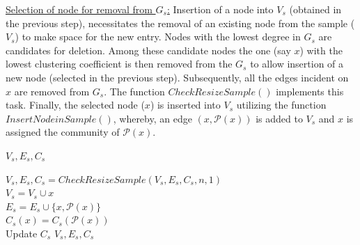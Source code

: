 \noindent\underline{Selection of node for removal from $G_s$:}
Insertion of a node into $V_s$  (obtained in the previous step), 
necessitates the removal of an existing node from the sample ($V_s$) to make space for the new entry. 
Nodes with the lowest degree in $G_s$ are candidates for deletion. Among these candidate nodes the one (say $x$) with  the lowest clustering coefficient is then removed from the $G_s$ to allow insertion of a new node (selected in the previous step). Subsequently, all the edges incident on $x$ are removed from $G_s$. The function $CheckResizeSample()$ implements this task. Finally, the selected node ($x$) is inserted into $V_s$ utilizing the function $InsertNodeinSample()$, whereby, an edge $(x,\mathcal{P}(x))$ is added to $V_s$ and $x$ is assigned the community of $\mathcal{P}(x)$. 

\begin{function4}[!ht]
\caption{\small$CheckResizeSample(V_s,C_s,n,m)$}
\label{resizesample}
\Return $V_s,E_s,C_s$
\end{function4}

\begin{function5}[!ht]
 \caption{\small $InsertNodeinSample(x,\mathcal{P}(x),V_s,E_s,C_s)$}
 \label{insertnodesample}
 $V_s,E_s,C_s=CheckResizeSample(V_s,E_s,C_s,n,1)$ \\
 $V_s = V_s \cup x$ \\
 $E_s = E_s \cup \{x,\mathcal{P}(x)\}$ \\
 $C_s(x) = C_s(\mathcal{P}(x))$ \\
 Update $C_s$
 \Return $V_s,E_s,C_s$
\end{function5}


